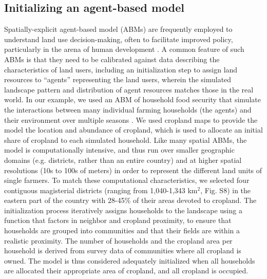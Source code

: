 \documentclass{pnastwo}
\begin{document}
\begin{article}
\subsection{Initializing an agent-based model}
Spatially-explicit agent-based model (ABMs) are frequently employed to understand land use decision-making, often to facilitate improved policy, particularly in the arena of human development \cite{berger_creating_2006}. A common feature of such ABMs is that they need to be calibrated against data describing the characteristics of land users, including an initialization step to assign land resources to ``agents'' representing the land users, wherein the simulated landscape pattern and distribution of agent resources matches those in the real world. In our example, we used an ABM of household food security that simulate the interactions between many individual farming households (the agents) and their environment over multiple seasons \cite{chen_dependency_2013}. We used cropland maps to provide the model the location and abundance of cropland, which is used to allocate an initial share of cropland to each simulated household. Like many spatial ABMs, the model is computationally intensive, and thus run over smaller geographic domains (e.g. districts, rather than an entire country) and at higher spatial resolutions (10s to 100s of meters) in order to represent the different land units of single farmers. To match these computational characteristics, we selected four contiguous magisterial districts (ranging from 1,040-1,343 km$^2$, Fig. S8) in the eastern part of the country with 28-45\% of their areas devoted to cropland. The initialization process iteratively assigns households to the landscape using a function that factors in neighbor and cropland proximity, to ensure that households are grouped into communities and that their fields are within a realistic proximity. The number of households and the cropland area per household is derived from survey data of communities where all cropland is owned. The model is thus considered adequately initialized when all households are allocated their appropriate area of cropland, and all cropland is occupied. 


\end{article}
\end{document}
